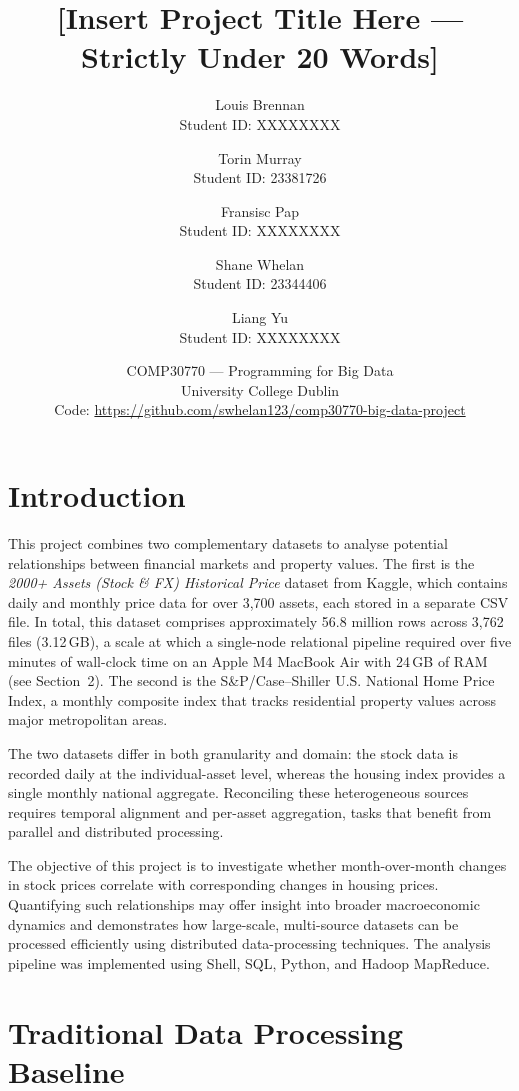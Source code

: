 \documentclass[11pt]{article}
\title{\textbf{[Insert Project Title Here — Strictly Under 20 Words]}}
\author{
  Louis Brennan \\{\small Student ID: XXXXXXXX}
  \and
  Torin Murray \\{\small Student ID: 23381726}
  \and
  Fransisc Pap \\{\small Student ID: XXXXXXXX}
  \and
  Shane Whelan \\{\small Student ID: 23344406}
  \and
  Liang Yu \\{\small Student ID: XXXXXXXX}
}
\date{
  COMP30770 --- Programming for Big Data \\
  University College Dublin \\
  \vspace{4pt}
  Code: \url{https://github.com/swhelan123/comp30770-big-data-project}
}
\begin{document}
\maketitle


\section{Introduction}

This project combines two complementary datasets to analyse potential relationships between financial markets and property values. The first is the \textit{2000+ Assets (Stock \& FX) Historical Price} dataset from Kaggle, which contains daily and monthly price data for over 3,700 assets, each stored in a separate CSV file. In total, this dataset comprises approximately 56.8 million rows across 3,762 files (3.12\,GB), a scale at which a single-node relational pipeline required over five minutes of wall-clock time on an Apple M4 MacBook Air with 24\,GB of RAM (see Section~2). The second is the S\&P/Case--Shiller U.S. National Home Price Index, a monthly composite index that tracks residential property values across major metropolitan areas.

The two datasets differ in both granularity and domain: the stock data is recorded daily at the individual-asset level, whereas the housing index provides a single monthly national aggregate. Reconciling these heterogeneous sources requires temporal alignment and per-asset aggregation, tasks that benefit from parallel and distributed processing.

The objective of this project is to investigate whether month-over-month changes in stock prices correlate with corresponding changes in housing prices. Quantifying such relationships may offer insight into broader macroeconomic dynamics and demonstrates how large-scale, multi-source datasets can be processed efficiently using distributed data-processing techniques. The analysis pipeline was implemented using Shell, SQL, Python, and Hadoop MapReduce.

\section{Traditional Data Processing Baseline}
\end{document}

